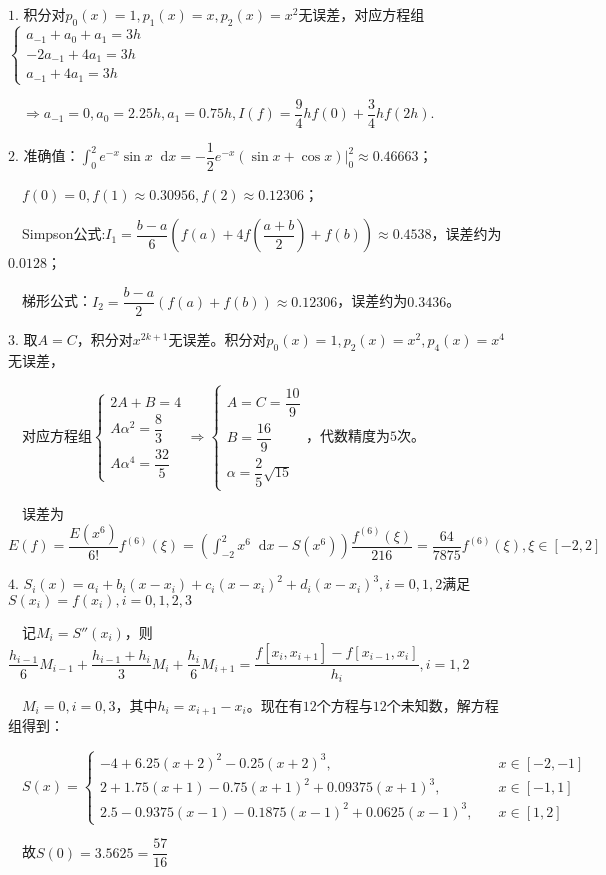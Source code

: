 \documentclass[cn,hazy,green,11pt,normal]{elegantnote}
\newcommand*{\diff}{\mathop{}\!\mathrm{d}}
\begin{document}
    $1.\,\,$积分对$p_0(x)=1,p_1(x)=x,p_2(x)=x^2$无误差，对应方程组$\begin{cases}a_{-1}+a_0+a_1=3h\\-2a_{-1}+4a_1=3h\\a_{-1}+4a_1=3h\end{cases}$

    $\quad\Rightarrow a_{-1}=0,a_0=2.25h,a_1=0.75h,I(f)=\dfrac94 hf(0)+\dfrac34 hf(2h).$

    $2.\,\,$准确值：$\int_0^2 e^{-x}\sin x\diff x=-\dfrac12 e^{-x}(\sin x+\cos x)\Big|_0^2\approx 0.46663$；

    $\quad f(0)=0,f(1)\approx0.30956,f(2)\approx0.12306$；

    $\quad$Simpson公式:$I_1=\dfrac{b-a}6\left(f(a)+4f\left(\dfrac{a+b}2\right)+f(b)\right)\approx0.4538$，误差约为$0.0128$；

    $\quad$梯形公式：$I_2=\dfrac{b-a}{2}(f(a)+f(b))\approx0.12306$，误差约为$0.3436$。

    $3.\,\,$取$A=C$，积分对$x^{2k+1}$无误差。积分对$p_0(x)=1,p_2(x)=x^2,p_4(x)=x^4$无误差，

    $\quad$对应方程组$\begin{cases}2A+B=4\\A\alpha^2=\dfrac83\\A\alpha^4=\dfrac{32}5\end{cases}\Longrightarrow\begin{cases}A=C=\dfrac{10}9\\B=\dfrac{16}9\\\alpha=\dfrac25\sqrt{15}\end{cases}$，代数精度为$5$次。

    $\quad$误差为$E(f)=\dfrac{E(x^6)}{6!}f^{(6)}(\xi)=\left(\int_{-2}^2 x^6\diff x-S(x^6)\right)\dfrac{f^{(6)}(\xi)}{216}=\dfrac{64}{7875} f^{(6)}(\xi),\xi\in[-2,2]$

    $4.\,\,S_i(x)=a_i+b_i(x-x_i)+c_i(x-x_i)^2+d_i(x-x_i)^3,i=0,1,2$满足$S(x_i)=f(x_i),i=0,1,2,3$

    $\quad$记$M_i=S''(x_i)$，则$\dfrac{h_{i-1}}{6}M_{i-1}+\dfrac{h_{i-1}+h_i}{3}M_i+\dfrac{h_i}{6}M_{i+1}=\dfrac{f[x_i,x_{i+1}]-f[x_{i-1},x_i]}{h_i},i=1,2$

    $\quad M_i=0,i=0,3$，其中$h_i=x_{i+1}-x_i$。现在有$12$个方程与$12$个未知数，解方程组得到：

    $\quad S(x)=\begin{cases}-4+6.25(x+2)^2-0.25(x+2)^3,\quad&x\in[-2,-1]\\2+1.75(x+1)-0.75(x+1)^2+0.09375(x+1)^3,\quad&x\in[-1,1]\\2.5-0.9375(x-1)-0.1875(x-1)^2+0.0625(x-1)^3,\quad&x\in[1,2]\end{cases}$

    $\quad$故$S(0)=3.5625=\dfrac{57}{16}$
\end{document}
